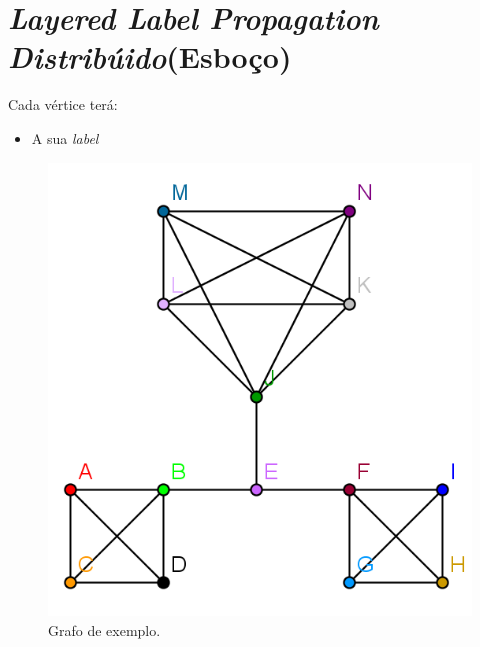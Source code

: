\documentclass[a4paper,10pt]{report}
\title{}
\author{}
\begin{document}
\section*{\textit{Layered Label Propagation Distribúido}(Esboço)}

Cada vértice terá:
\begin{itemize}
  \item A sua \textit{label}
\end{itemize}

\begin{figure}[h]
\center
\includegraphics{graph_step0}
\caption{Grafo de exemplo.\label{fig:distributedexample1}}
\end{figure}
\end{document}
